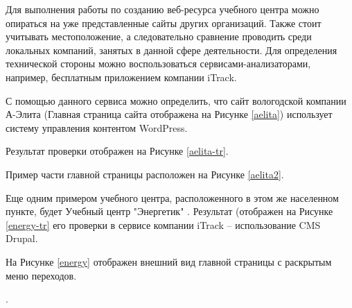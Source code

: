 Для выполнения работы по созданию веб-ресурса учебного центра можно опираться на уже представленные сайты других организаций.
Также стоит учитывать местоположение, а следовательно сравнение проводить среди локальных компаний, занятых в данной сфере деятельности.
Для определения технической стороны можно воспользоваться сервисами-анализаторами, например, бесплатным приложением \cite{iTrack} компании iTrack. 

С помощью данного сервиса можно определить, что сайт вологодской компании А-Элита \cite{aelita} (Главная страница сайта отображена на Рисунке \ref{aelita}) использует систему управления контентом WordPress.


Результат проверки отображен на Рисунке \ref{aelita-tr}.


Пример части главной страницы расположен на Рисунке \ref{aelita2}.


Еще одним примером учебного центра, расположенного в этом же населенном пункте, будет Учебный центр "Энергетик" \cite{energy}.
Результат (отображен на Рисунке \ref{energy-tr} его проверки в сервисе компании iTrack -- использование CMS Drupal.


На Рисунке \ref{energy} отображен внешний вид главной страницы с раскрытым меню переходов.

.


\clearpage
